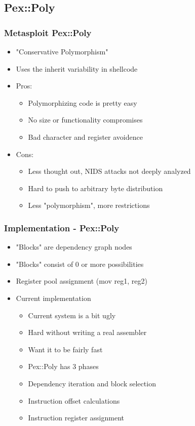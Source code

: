 \documentclass{beamer}
\newenvironment{sitemize}{\vspace{1mm}\begin{itemize}\itemsep 4pt\small}{\end{itemize}}
\begin{document}
\subsection{Pex::Poly}

\begin{frame}[t]
  \frametitle{Metasploit Pex::Poly}
  \begin{sitemize}
    \item "Conservative Polymorphism"
    \item Uses the inherit variability in shellcode
    \pause
    \item Pros:
    \begin{sitemize}
      \item Polymorphizing code is pretty easy
      \item No size or functionality compromises
      \item Bad character and register avoidence
    \end{sitemize}
    \pause
    \item Cons:
    \begin{sitemize}
      \item Less thought out, NIDS attacks not deeply analyzed
      \item Hard to push to arbitrary byte distribution
      \item Less "polymorphism", more restrictions
    \end{sitemize}
  \end{sitemize}
\end{frame}

\begin{frame}[t]
  \frametitle{Implementation - Pex::Poly}
  \begin{sitemize}
    \item "Blocks" are dependency graph nodes
    \item "Blocks" consist of 0 or more possibilities
    \item Register pool assignment (mov reg1, reg2)
    \pause
    \item Current implementation
    \begin{sitemize}
      \item Current system is a bit ugly
      \item Hard without writing a real assembler
      \item Want it to be fairly fast
      \pause
      \item Pex::Poly has 3 phases
      \item Dependency iteration and block selection
      \item Instruction offset calculations
      \item Instruction register assignment
    \end{sitemize}
  \end{sitemize}
\end{frame}
\end{document}
